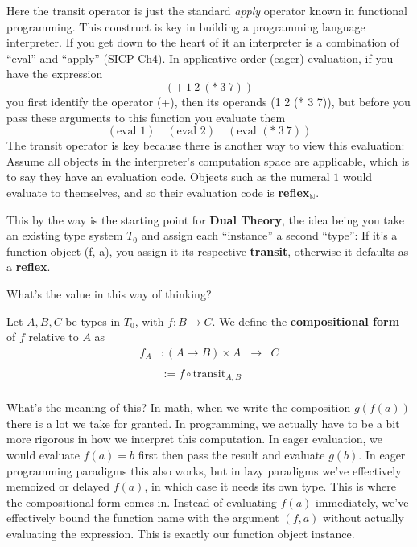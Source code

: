 \documentclass[twoside]{article}
\newenvironment{definition}[1][Definition]{\begin{trivlist}
\item[\hskip \labelsep {\bfseries Definition (#1):}]}{\end{trivlist}}
\begin{document}
Here the transit operator is just the standard \emph{apply} operator known in functional programming.
This construct is key in building a programming language interpreter. If you get down to the heart of it
an interpreter is a combination of ``eval'' and ``apply'' (SICP Ch4). In applicative order (eager) evaluation,
if you have the expression
$$ (+\ 1\ 2\ (*\ 3\ 7)) $$
you first identify the operator (+), then its operands (1 2 (* 3 7)), but before you pass these arguments to this
function you evaluate them
$$ (\mbox{eval } 1)\quad (\mbox{eval }2)\quad (\mbox{eval } (*\ 3\ 7)) $$
The transit operator is key because there is another way to view this evaluation: Assume all objects in the interpreter's
computation space are applicable, which is to say they have an evaluation code. Objects such as the numeral $ 1 $ would
evaluate to themselves, and so their evaluation code is {\bf reflex}$ _\mathbb{N} $.

This by the way is the starting point for {\bf Dual Theory}, the idea being you take an existing type system $ T_0 $
and assign each ``instance'' a second ``type'': If it's a function object (f, a), you assign it its respective {\bf transit},
otherwise it defaults as a {\bf reflex}.\\[0.5cm]

\newpage

What's the value in this way of thinking?

\begin{definition}[compositional form]
Let $ A, B, C $ be types in $ T_0 $, with $ f : B\to C $. We define the
{\bf compositional form} of $ f $ relative to $ A $ as
$$ \begin{array}{rlcl}
f_A	& : (A\to B)\times A	& \to	& C		\\
							\\
	& := f\circ \mbox{transit}_{A,B}		\\
\end{array} $$

\end{definition}
What's the meaning of this? In math, when we write the composition $ g(f(a)) $ there is a lot we take for granted.
In programming, we actually have to be a bit more rigorous in how we interpret this computation. In eager evaluation,
we would evaluate $ f(a)=b $ first then pass the result and evaluate $ g(b) $. In eager programming paradigms this also
works, but in lazy paradigms we've effectively memoized or delayed $ f(a) $, in which case it needs its own type.
This is where the compositional form comes in. Instead of evaluating $ f(a) $ immediately, we've effectively bound
the function name with the argument $ (f, a) $ without actually evaluating the expression. This is exactly our
function object instance.
\end{document}
